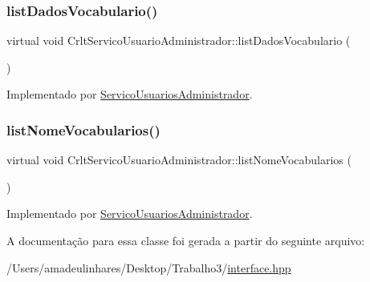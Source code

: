 \subsubsection{\texorpdfstring{list\+Dados\+Vocabulario()}{listDadosVocabulario()}}
{\footnotesize\ttfamily virtual void Crlt\+Servico\+Usuario\+Administrador\+::list\+Dados\+Vocabulario (\begin{DoxyParamCaption}{ }\end{DoxyParamCaption})\hspace{0.3cm}{\ttfamily [pure virtual]}}



Implementado por \mbox{\hyperlink{class_servico_usuarios_administrador_adddc69a01b3ffb101f3a0b5825dde223}{Servico\+Usuarios\+Administrador}}.

\mbox{\label{class_crlt_servico_usuario_administrador_ad9ced45046d895a48f1b84b975b89cb1}} 
\subsubsection{\texorpdfstring{list\+Nome\+Vocabularios()}{listNomeVocabularios()}}
{\footnotesize\ttfamily virtual void Crlt\+Servico\+Usuario\+Administrador\+::list\+Nome\+Vocabularios (\begin{DoxyParamCaption}{ }\end{DoxyParamCaption})\hspace{0.3cm}{\ttfamily [pure virtual]}}



Implementado por \mbox{\hyperlink{class_servico_usuarios_administrador_a72b7761474e413704531b3234744d0e0}{Servico\+Usuarios\+Administrador}}.



A documentação para essa classe foi gerada a partir do seguinte arquivo\+:\begin{DoxyCompactItemize}
\item 
/\+Users/amadeulinhares/\+Desktop/\+Trabalho3/\mbox{\hyperlink{interface_8hpp}{interface.\+hpp}}\end{DoxyCompactItemize}
